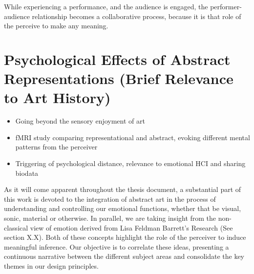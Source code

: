 While experiencing a performance, and the audience is engaged, the performer-audience relationship becomes a collaborative process, because it is that role of the perceive to make any meaning.

\section{Psychological Effects of Abstract Representations (Brief Relevance to Art History)}
\label{lit_review:psychology_aesthetics}

\begin{itemize}
\item Going beyond the sensory enjoyment of art
\item fMRI study comparing representational and abstract, evoking different mental patterns from the perceiver
\item Triggering of psychological distance, relevance to emotional HCI and sharing biodata
\end{itemize}

As it will come apparent throughout the thesis document, a substantial part of this work is devoted to the integration of abstract art in the process of understanding and controlling our emotional functions, whether that be visual, sonic, material or otherwise. In parallel, we are taking insight from the non-classical view of emotion derived from Lisa Feldman Barrett's Research (See section X.X). Both of these concepts highlight the role of the perceiver to induce meaningful inference. Our objective is to correlate these ideas, presenting a continuous narrative between the different subject areas and consolidate the key themes in our design principles.  

